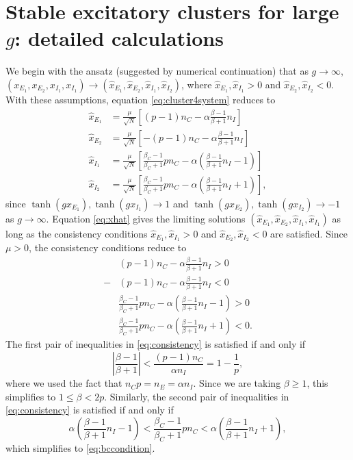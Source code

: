 \documentclass[reqno]{siamonline190516}
\begin{document}
\section{Stable excitatory clusters for large \texorpdfstring{$g$}{g}: detailed calculations} 
\label{app:C1C2I1I2_largeg}
We begin with the ansatz (suggested by numerical continuation) that as $g \rightarrow \infty$, $(x_{E_1}, x_{E_2}, x_{I_1}, x_{I_1}) \rightarrow (\hat{x}_{E_1}, \hat{x}_{E_2}, \hat{x}_{I_1}, \hat{x}_{I_2})$, where $\hat{x}_{E_1}, \hat{x}_{I_1} > 0$ and $\hat{x}_{E_2}, \hat{x}_{I_2} < 0$. 
With these assumptions, equation \cref{eq:cluster4system} reduces to 
\begin{equation}\label{eq:xhat}
    \begin{aligned}
        \hat{x}_{E_1} &= \frac{\mu}{\sqrt{N}}\left[ (p-1)n_C - \alpha \frac{\beta-1}{\beta+1}n_I \right] \\
        \hat{x}_{E_2} &= \frac{\mu}{\sqrt{N}}\left[ -(p-1)n_C - \alpha \frac{\beta-1}{\beta+1}n_I \right] \\
        \hat{x}_{I_1} &= \frac{\mu}{\sqrt{N}}\left[  \frac{\beta_C-1}{\beta_C+1} p n_C - \alpha \left( \frac{\beta-1}{\beta+1}n_I - 1 \right) \right] \\
        \hat{x}_{I_2} &= \frac{\mu}{\sqrt{N}}\left[  \frac{\beta_C-1}{\beta_C+1} p n_C - \alpha \left( \frac{\beta-1}{\beta+1}n_I + 1 \right) \right],
    \end{aligned}
\end{equation}
since $\tanh(g x_{E_1}), \tanh(g x_{I_1}) \rightarrow 1$ and $\tanh(g x_{E_2}), \tanh(g x_{I_2}) \rightarrow -1$ as $g \rightarrow \infty$. Equation \cref{eq:xhat} gives the limiting solutions $(\hat{x}_{E_1}, \hat{x}_{E_2}, \hat{x}_{I_1}, \hat{x}_{I_1})$ as long as the consistency conditions $\hat{x}_{E_1}, \hat{x}_{I_1} > 0$ and $\hat{x}_{E_2}, \hat{x}_{I_2} < 0$ are satisfied. Since $\mu > 0$, the consistency conditions reduce to
\begin{equation}\label{eq:consistency}
    \begin{aligned}
        &(p-1)n_C - \alpha \frac{\beta-1}{\beta+1}n_I > 0 \\
        -&(p-1)n_C - \alpha \frac{\beta-1}{\beta+1}n_I < 0 \\
        &\frac{\beta_C-1}{\beta_C+1} p n_C - \alpha \left( \frac{\beta-1}{\beta+1}n_I - 1 \right) > 0 \\
        &\frac{\beta_C-1}{\beta_C+1} p n_C - \alpha \left( \frac{\beta-1}{\beta+1}n_I + 1 \right) < 0.
    \end{aligned}
\end{equation}
The first pair of inequalities in \cref{eq:consistency} is satisfied if and only if
\[
    \left| \frac{\beta-1}{\beta+1} \right| < \frac{(p-1)n_C}{\alpha n_I} = 1 - \frac{1}{p},
\]
where we used the fact that $n_C p = n_E = \alpha n_I$. Since we are taking $\beta \geq 1$, this simplifies to $1 \leq \beta < 2p$. 
Similarly, the second pair of inequalities in \cref{eq:consistency} is satisfied if and only if 
\[
    \alpha \left( \frac{\beta-1}{\beta+1}n_I - 1 \right) < \frac{\beta_C-1}{\beta_C+1} p n_C < \alpha \left( \frac{\beta-1}{\beta+1}n_I + 1 \right),
\]
which simplifies to \cref{eq:bccondition}.



\end{document}
